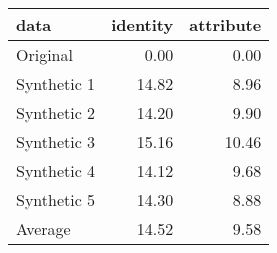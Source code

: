 \begin{tabular}{lrr}
  \toprule
data & identity & attribute \\ 
  \midrule
Original & 0.00 & 0.00 \\ 
  Synthetic 1 & 14.82 & 8.96 \\ 
  Synthetic 2 & 14.20 & 9.90 \\ 
  Synthetic 3 & 15.16 & 10.46 \\ 
  Synthetic 4 & 14.12 & 9.68 \\ 
  Synthetic 5 & 14.30 & 8.88 \\ 
  Average & 14.52 & 9.58 \\ 
   \bottomrule
\end{tabular}
